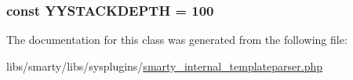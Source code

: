 \subsubsection[{Y\+Y\+S\+T\+A\+C\+K\+D\+E\+P\+T\+H}]{\setlength{\rightskip}{0pt plus 5cm}const Y\+Y\+S\+T\+A\+C\+K\+D\+E\+P\+T\+H = 100}\label{class_smarty___internal___templateparser_af16eacc338babe0d3b328c54aa40b98f}


The documentation for this class was generated from the following file\+:\begin{DoxyCompactItemize}
\item 
libs/smarty/libs/sysplugins/\hyperlink{smarty__internal__templateparser_8php}{smarty\+\_\+internal\+\_\+templateparser.\+php}\end{DoxyCompactItemize}
